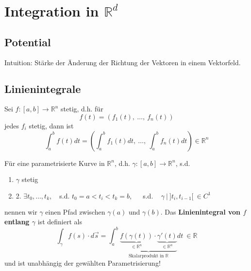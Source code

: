 \section{Integration in $\mathbb{R}^d$}

\subsection{Potential}

Intuition: Stärke der Änderung der Richtung der Vektoren in einem Vektorfeld.

\subsection{Linienintegrale}

Sei $f: [a, b] \rightarrow \mathbb{R}^{n}$ stetig, d.h. für
\[ f(t) = (f_1(t), ~ \ldots, ~ f_n(t)) \]
jedes $f_i$ stetig, dann ist
\[ \int_a^b f(t) dt = \left( \int_a^b f_1(t) dt, ~ \ldots , ~ \int_a^b f_n(t) dt\right) \in \mathbb{R}^n \]

Für eine parametrisierte Kurve in $\mathbb{R}^n$, d.h.
$\gamma : [a, b] \rightarrow \mathbb{R}^n$, s.d.
\begin{enumerate}
\item{ $\gamma$ stetig}
\item{2. $\exists t_0, \ldots, t_k$, ~ s.d. $t_0 = a < t_i < t_k = b$, ~~ s.d. ~
$\gamma ~ | ~ ]t_i, t_{i-1}[ ~ \in C^1$}
\end{enumerate}
nennen wir $\gamma$ einen Pfad zwischen
$\gamma(a)$ und $\gamma(b)$. 
Das \textbf{Linienintegral von $f$ entlang $\gamma$} ist definiert als
\[ \int_{\gamma} f(s)\cdot d\vec{s} = 
	\int_a^b \underbrace{\underbrace{f(\gamma(t))}_{\in\mathbb{R}^n}  \cdot 
	\underbrace{\gamma'(t)}_{\in\mathbb{R}^n}}_{\text{Skalarprodukt in } \mathbb{R}} dt  ~
	\in \mathbb{R} \]
und ist unabhängig der gewählten Parametrisierung!

